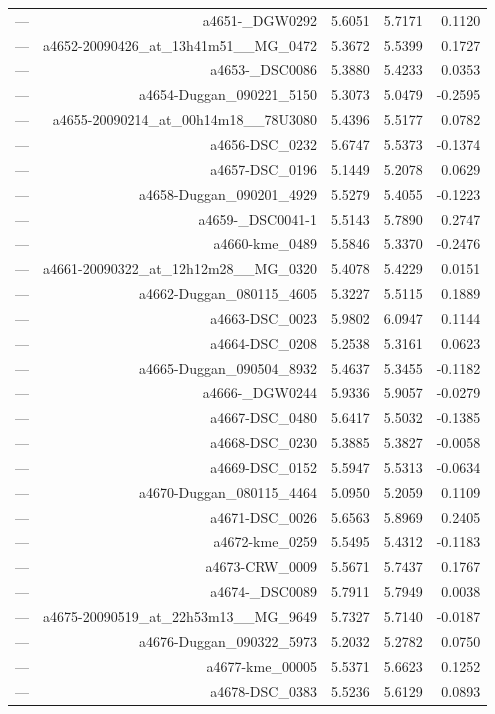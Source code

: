 \begin{table}[htbp]
\begin{tabular}{lrrrr}
— & a4651-_DGW0292 & 5.6051 & 5.7171 & 0.1120 \\
— & a4652-20090426_at_13h41m51__MG_0472 & 5.3672 & 5.5399 & 0.1727 \\
— & a4653-_DSC0086 & 5.3880 & 5.4233 & 0.0353 \\
— & a4654-Duggan_090221_5150 & 5.3073 & 5.0479 & -0.2595 \\
— & a4655-20090214_at_00h14m18__78U3080 & 5.4396 & 5.5177 & 0.0782 \\
— & a4656-DSC_0232 & 5.6747 & 5.5373 & -0.1374 \\
— & a4657-DSC_0196 & 5.1449 & 5.2078 & 0.0629 \\
— & a4658-Duggan_090201_4929 & 5.5279 & 5.4055 & -0.1223 \\
— & a4659-_DSC0041-1 & 5.5143 & 5.7890 & 0.2747 \\
— & a4660-kme_0489 & 5.5846 & 5.3370 & -0.2476 \\
— & a4661-20090322_at_12h12m28__MG_0320 & 5.4078 & 5.4229 & 0.0151 \\
— & a4662-Duggan_080115_4605 & 5.3227 & 5.5115 & 0.1889 \\
— & a4663-DSC_0023 & 5.9802 & 6.0947 & 0.1144 \\
— & a4664-DSC_0208 & 5.2538 & 5.3161 & 0.0623 \\
— & a4665-Duggan_090504_8932 & 5.4637 & 5.3455 & -0.1182 \\
— & a4666-_DGW0244 & 5.9336 & 5.9057 & -0.0279 \\
— & a4667-DSC_0480 & 5.6417 & 5.5032 & -0.1385 \\
— & a4668-DSC_0230 & 5.3885 & 5.3827 & -0.0058 \\
— & a4669-DSC_0152 & 5.5947 & 5.5313 & -0.0634 \\
— & a4670-Duggan_080115_4464 & 5.0950 & 5.2059 & 0.1109 \\
— & a4671-DSC_0026 & 5.6563 & 5.8969 & 0.2405 \\
— & a4672-kme_0259 & 5.5495 & 5.4312 & -0.1183 \\
— & a4673-CRW_0009 & 5.5671 & 5.7437 & 0.1767 \\
— & a4674-_DSC0089 & 5.7911 & 5.7949 & 0.0038 \\
— & a4675-20090519_at_22h53m13__MG_9649 & 5.7327 & 5.7140 & -0.0187 \\
— & a4676-Duggan_090322_5973 & 5.2032 & 5.2782 & 0.0750 \\
— & a4677-kme_00005 & 5.5371 & 5.6623 & 0.1252 \\
— & a4678-DSC_0383 & 5.5236 & 5.6129 & 0.0893 \\

\end{tabular}
\end{table}
